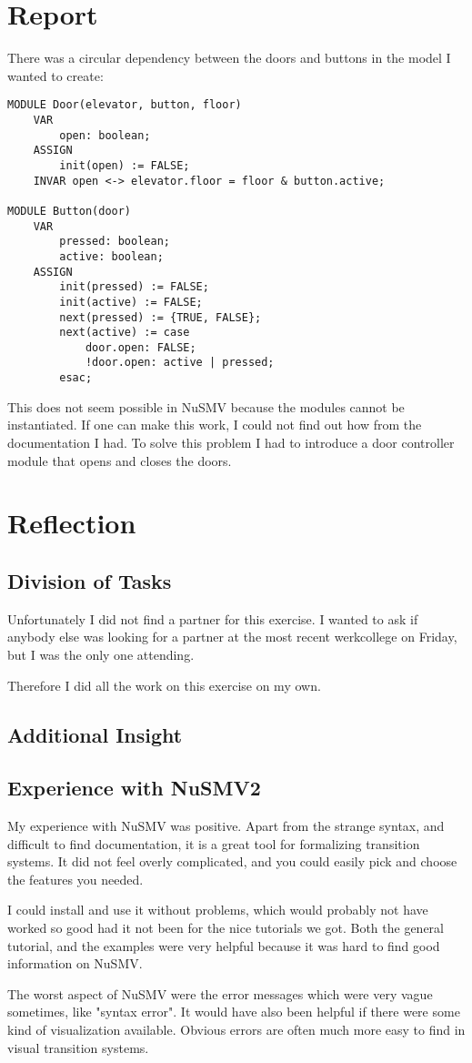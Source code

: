 \documentclass[12pt, a4paper]{article}
\begin{document}
\section{Report}
There was a circular dependency between the doors and buttons in the model I wanted to create:

\begin{lstlisting}
MODULE Door(elevator, button, floor)
	VAR
		open: boolean;
	ASSIGN
		init(open) := FALSE;
	INVAR open <-> elevator.floor = floor & button.active;

MODULE Button(door)
	VAR
		pressed: boolean;
		active: boolean;
	ASSIGN
		init(pressed) := FALSE;
		init(active) := FALSE;
		next(pressed) := {TRUE, FALSE};
		next(active) := case
			door.open: FALSE;
			!door.open: active | pressed;
		esac;
\end{lstlisting}

This does not seem possible in NuSMV because the modules cannot be instantiated. If one can make this work, I could not find out how from the documentation I had. To solve this problem I had to introduce a door controller module that opens and closes the doors.

\section{Reflection}
\subsection{Division of Tasks}
Unfortunately I did not find a partner for this exercise. I wanted to ask if anybody else was looking for a partner at the most recent werkcollege on Friday, but I was the only one attending.

Therefore I did all the work on this exercise on my own.

\subsection{Additional Insight}

\subsection{Experience with NuSMV2}
My experience with NuSMV was positive. Apart from the strange syntax, and difficult to find documentation, it is a great tool for formalizing transition systems. It did not feel overly complicated, and you could easily pick and choose the features you needed.

I could install and use it without problems, which would probably not have worked so good had it not been for the nice tutorials we got. Both the general tutorial, and the examples were very helpful because it was hard to find good information on NuSMV.

The worst aspect of NuSMV were the error messages which were very vague sometimes, like "syntax error". It would have also been helpful if there were some kind of visualization available. Obvious errors are often much more easy to find in visual transition systems.
\end{document}
